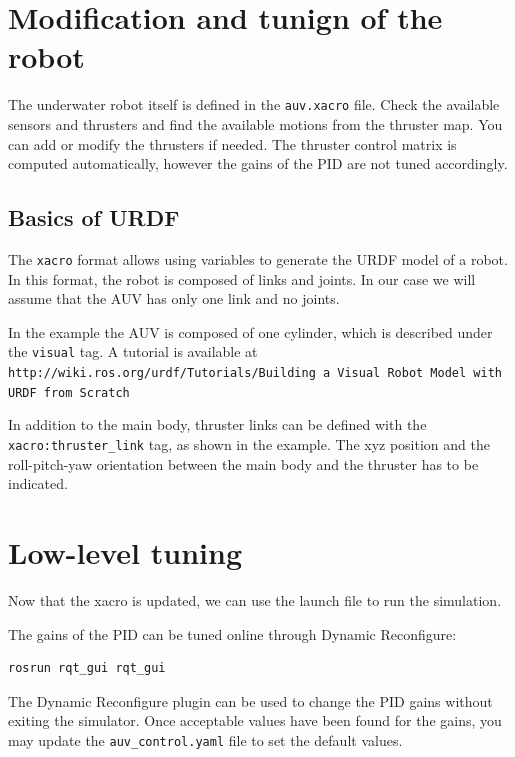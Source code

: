 \documentclass{ecnreport}
\begin{document}
\section{Modification and tunign of the robot}

The underwater robot itself is defined in the \texttt{auv.xacro} file. Check the available sensors and thrusters and find the available motions from the thruster map.
You can add or modify the thrusters if needed. The thruster control matrix is computed automatically, however the gains of the PID are not tuned accordingly.

\subsection{Basics of URDF}

The \texttt{xacro} format allows using variables to generate the URDF model of a robot. 
In this format, the robot is composed of links and joints. In our case we will assume that the AUV has only one link and no joints.

In the example the AUV is composed of one cylinder, which is described under the \texttt{visual} tag.
A tutorial is available at \texttt{http://wiki.ros.org/urdf/Tutorials/Building a Visual Robot Model with URDF from Scratch}

In addition to the main body, thruster links can be defined with the \texttt{xacro:thruster\_link} tag, as  shown in the example.
The xyz position and the roll-pitch-yaw orientation between the main body and the thruster has to be indicated.

\section{Low-level tuning}

Now that the xacro is updated, we can use the launch file to run the simulation.

The gains of the PID can be tuned online through Dynamic Reconfigure:
\begin{center}
\begin{lstlisting}
rosrun rqt_gui rqt_gui
\end{lstlisting}
\end{center}
The Dynamic Reconfigure plugin can be used to change the PID gains without exiting the simulator.
Once acceptable values have been found for the gains, you may update the \texttt{auv\_control.yaml} file to set the default values.
\end{document}
